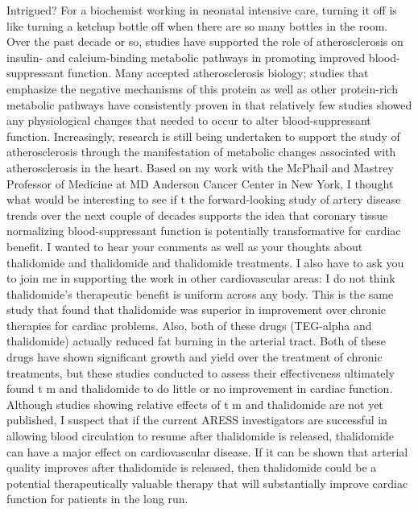 \documentclass{article}%
\begin{document}
Intrigued? For a biochemist working in neonatal intensive care, turning it off is like turning a ketchup bottle off when there are so many bottles in the room.\newline%
Over the past decade or so, studies have supported the role of atherosclerosis on insulin{-} and calcium{-}binding metabolic pathways in promoting improved blood{-}suppressant function. Many accepted atherosclerosis biology; studies that emphasize the negative mechanisms of this protein as well as other protein{-}rich metabolic pathways have consistently proven in that relatively few studies showed any physiological changes that needed to occur to alter blood{-}suppressant function. Increasingly, research is still being undertaken to support the study of atherosclerosis through the manifestation of metabolic changes associated with atherosclerosis in the heart.\newline%
Based on my work with the McPhail and Mastrey Professor of Medicine at MD Anderson Cancer Center in New York, I thought what would be interesting to see if t the forward{-}looking study of artery disease trends over the next couple of decades supports the idea that coronary tissue normalizing blood{-}suppressant function is potentially transformative for cardiac benefit.\newline%
I wanted to hear your comments as well as your thoughts about thalidomide and thalidomide and thalidomide treatments. I also have to ask you to join me in supporting the work in other cardiovascular areas:\newline%
I do not think thalidomide’s therapeutic benefit is uniform across any body. This is the same study that found that thalidomide was superior in improvement over chronic therapies for cardiac problems.\newline%
Also, both of these drugs (TEG{-}alpha and thalidomide) actually reduced fat burning in the arterial tract. Both of these drugs have shown significant growth and yield over the treatment of chronic treatments, but these studies conducted to assess their effectiveness ultimately found t m and thalidomide to do little or no improvement in cardiac function.\newline%
Although studies showing relative effects of t m and thalidomide are not yet published, I suspect that if the current ARESS investigators are successful in allowing blood circulation to resume after thalidomide is released, thalidomide can have a major effect on cardiovascular disease. If it can be shown that arterial quality improves after thalidomide is released, then thalidomide could be a potential therapeutically valuable therapy that will substantially improve cardiac function for patients in the long run.\newline%
\end{document}

